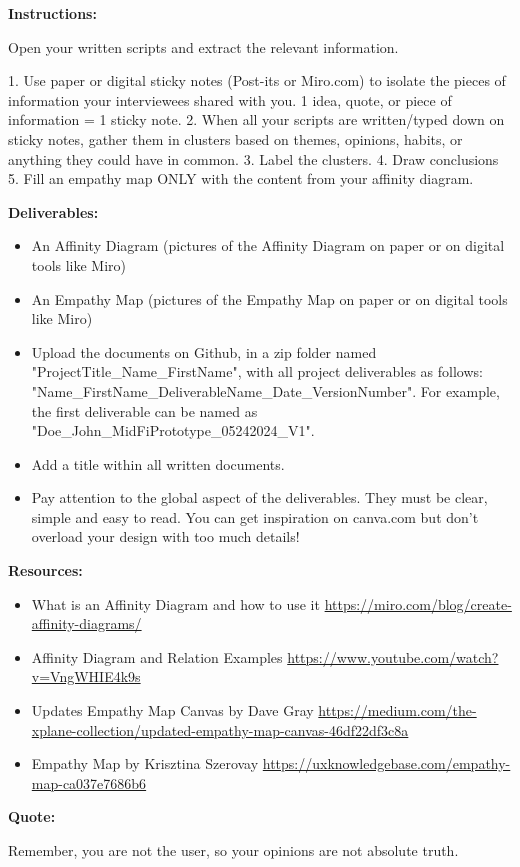 \makeheaderfiles

\textbf{Instructions:}

Open your written scripts and extract the relevant information.

1. Use paper or digital sticky notes (Post-its or Miro.com) to isolate the pieces of information your interviewees shared with you.
1 idea, quote, or piece of information = 1 sticky note.
2. When all your scripts are written/typed down on sticky notes, gather them in clusters based on themes, opinions, habits, or anything they could have in common.
3. Label the clusters.
4. Draw conclusions
5. Fill an empathy map ONLY with the content from your affinity diagram.

\textbf{Deliverables:}

\begin{itemize}
\item An Affinity Diagram (pictures of the Affinity Diagram on paper or on digital tools like Miro)
\item An Empathy Map (pictures of the Empathy Map on paper or on digital tools like Miro)
\item Upload the documents on Github, in a zip folder named "ProjectTitle\_Name\_FirstName", with all project deliverables as follows: "Name\_FirstName\_DeliverableName\_Date\_VersionNumber".  For example, the first deliverable can be named as "Doe\_John\_MidFiPrototype\_05242024\_V1".
\item Add a title within all written documents.
\item Pay attention to the global aspect of the deliverables. They must be clear, simple and easy to read. You can get inspiration on canva.com but don't overload your design with too much details!
\end{itemize}

\textbf{Resources:}

\begin{itemize}
\item What is an Affinity Diagram and how to use it \url{https://miro.com/blog/create-affinity-diagrams/}
\item Affinity Diagram and Relation Examples \url{https://www.youtube.com/watch?v=VngWHIE4k9s}
\item Updates Empathy Map Canvas by Dave Gray \url{https://medium.com/the-xplane-collection/updated-empathy-map-canvas-46df22df3c8a}
\item Empathy Map by Krisztina Szerovay \url{https://uxknowledgebase.com/empathy-map-ca037e7686b6}
\end{itemize}

\textbf{Quote:}

Remember, you are not the user, so your opinions are not absolute truth.

